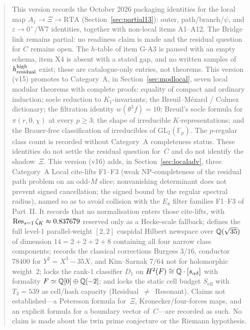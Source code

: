 \begin{abstract}
This version records the October 2026 packaging identities for the local map $A_1\to\Xi\to\mathrm{RTA}$ (Section~\ref{sec:partial13}): outer, path/branch/$\psi$, and $\varepsilon\to0^+$/W7 identities, together with non-local items A1--A12. The Bridge link remains partial: no readiness claim is made and the residual question for $C$ remains open. The $h$-table of item G-A3 is paused with an empty schema, item X4 is absent with a stated gap, and no written samples of $h_{\rm residual}^{\rm high}$ exist; these are catalogue-only entries, not theorems.
This version (v15) promotes to Category~A, in Section~\ref{sec:modlocal}, seven local modular theorems with complete proofs: equality of compact and ordinary induction; socle reduction to $K_1$-invariants; the Breuil--M\'ezard / Colmez dictionary; the filtration identity $w(\theta^3 f)=10$; Breuil's socle formula for $\pi(r,0,\chi)$ at every $p\ge3$; the shape of irreducible $K$-representations; and the Brauer-free classification of irreducibles of $\mathrm{GL}_2(\mathbb{F}_p)$. The $p$-regular class count is recorded without Category~A completeness status. These identities do not settle the residual question for~$C$ and do not identify the shadow~$\Xi$.
This version (v16) adds, in Section~\ref{sec:localadv}, three Category~A Local cite-lifts F1--F3 (weak NP-completeness of the residual path problem on an odd-$M$ slice; nonvanishing determinant does not prevent signed cancellation; the signed bound by the regular spectral radius), named so as to avoid collision with the $E_8$ filter families F1--F3 of Part~II. It records that no normalisation enters those cite-lifts, with $\Res_{s=1}\zeta_K\approx0.837679$ reserved only as a Hecke-scale fallback; defines the full level-$1$ parallel-weight $[2,2]$ cuspidal Hilbert newspace over $\Q(\sqrt{35})$ of dimension $14=2+2+2+8$ containing all four narrow class components; records the classical corrections Burgess $3/16$, conductor $78400$ for $Y^2=X^3-35X$, and Kim--Sarnak $7/64$ not for holomorphic weight~$2$; locks the rank-$1$ classifier $D_1$ on $H^2(F)\cong\Q\cdot[s_{\alpha\delta}]$ with formality $F\simeq\Q[0]\oplus\Q[-2]$; and locks the static cell budget $S_{\mathrm{eff}}$ with $T_3=539$ as cell/hash capacity (Residual~$\neq$~Resonant). Claims not established---a Petersson formula for~$\Xi$, Kronecker/four-forces maps, and an explicit formula for a boundary vector of~$C$---are recorded as such. No claim is made about the twin prime conjecture or the Riemann hypothesis.
\end{abstract}
\tableofcontents
\clearpage


